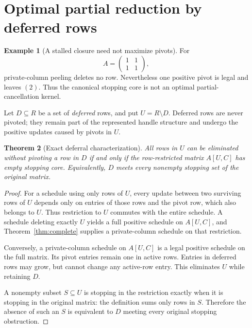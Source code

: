 \documentclass[11pt]{article}
\newtheorem{theorem}{Theorem}[section]
\theoremstyle{definition}\newtheorem{definition}[theorem]{Definition}
\newtheorem{example}[theorem]{Example}
\theoremstyle{remark}\newtheorem{remark}[theorem]{Remark}
\begin{document}
\section{Optimal partial reduction by deferred rows}
\label{sec:deferral}

\begin{example}[A stalled closure need not maximize pivots]
For
\[
 A=\begin{pmatrix}1&1\\1&1\end{pmatrix},
\]
private-column peeling deletes no row. Nevertheless one positive pivot is legal and leaves $(2)$. Thus the canonical stopping core is not an optimal partial-cancellation kernel.
\end{example}

Let $D\subseteq R$ be a set of \emph{deferred} rows, and put $U=R\setminus D$. Deferred rows are never pivoted; they remain part of the represented handle structure and undergo the positive updates caused by pivots in $U$.

\begin{theorem}[Exact deferral characterization]
\label{thm:deferral}
All rows in $U$ can be eliminated without pivoting a row in $D$ if and only if the row-restricted matrix $A[U,C]$ has empty stopping core. Equivalently, $D$ meets every nonempty stopping set of the original matrix.
\end{theorem}
\begin{proof}
For a schedule using only rows of $U$, every update between two surviving rows of $U$ depends only on entries of those rows and the pivot row, which also belongs to $U$. Thus restriction to $U$ commutes with the entire schedule. A schedule deleting exactly $U$ yields a full positive schedule on $A[U,C]$, and Theorem~\ref{thm:complete} supplies a private-column schedule on that restriction.

Conversely, a private-column schedule on $A[U,C]$ is a legal positive schedule on the full matrix. Its pivot entries remain one in active rows. Entries in deferred rows may grow, but cannot change any active-row entry. This eliminates $U$ while retaining $D$.

A nonempty subset $S\subseteq U$ is stopping in the restriction exactly when it is stopping in the original matrix: the definition sums only rows in $S$. Therefore the absence of such an $S$ is equivalent to $D$ meeting every original stopping obstruction.
\end{proof}
\end{document}
